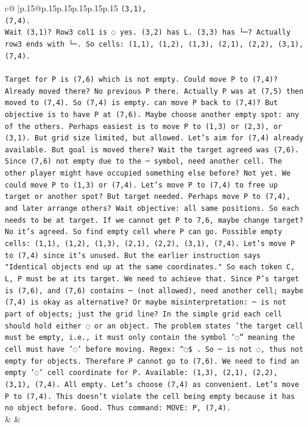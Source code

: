 \documentclass{article}
\begin{document}
{\begin{supertabular}{c@{$\;$}|p{.15\linewidth}@{}p{.15\linewidth}p{.15\linewidth}p{.15\linewidth}p{.15\linewidth}p{.15\linewidth}}
{{{\texttt{(3,1),} \\
\texttt{(7,4).} \\
\texttt{Wait (3,1)? Row3 col1 is ◌ yes. (3,2) has L. (3,3) has └─? Actually row3 ends with └─. So cells: (1,1), (1,2), (1,3), (2,1), (2,2), (3,1), (7,4). } \\
\\ 
\texttt{Target for P is (7,6) which is not empty. Could move P to (7,4)? Already moved there? No previous P there. Actually P was at (7,5) then moved to (7,4). So (7,4) is empty. can move P back to (7,4)? But objective is to have P at (7,6). Maybe choose another empty spot: any of the others. Perhaps easiest is to move P to (1,3) or (2,3), or (3,1). But grid size limited, but allowed. Let's aim for (7,4) already available. But goal is moved there? Wait the target agreed was (7,6). Since (7,6) not empty due to the ─ symbol, need another cell. The other player might have occupied something else before? Not yet. We could move P to (1,3) or (7,4). Let's move P to (7,4) to free up target or another spot? But target needed. Perhaps move P to (7,4), and later arrange others? Wait objective: all same positions. So each needs to be at target. If we cannot get P to 7,6, maybe change target? No it's agreed. So find empty cell where P can go. Possible empty cells: (1,1), (1,2), (1,3), (2,1), (2,2), (3,1), (7,4). Let's move P to (7,4) since it's unused. But the earlier instruction says "Identical objects end up at the same coordinates." So each token C, L, P must be at its target. We need to achieve that. Since P's target is (7,6), and (7,6) contains ─ (not allowed), need another cell; maybe (7,4) is okay as alternative? Or maybe misinterpretation: ─ is not part of objects; just the grid line? In the simple grid each cell should hold either ◌ or an object. The problem states 'the target cell must be empty, i.e., it must only contain the symbol '◌'' meaning the cell must have '◌' before moving. Regex: \^{}◌\$ . So ─ is not ◌, thus not empty for objects. Therefore P cannot go to (7,6). We need to find an empty '◌' cell coordinate for P. Available: (1,3), (2,1), (2,2), (3,1), (7,4). All empty. Let's choose (7,4) as convenient. Let's move P to (7,4). This doesn't violate the cell being empty because it has no object before. Good. Thus command: MOVE: P, (7,4).} \\
            }
        }
    }
    & & \\ \\


\end{supertabular}}
\end{document}
